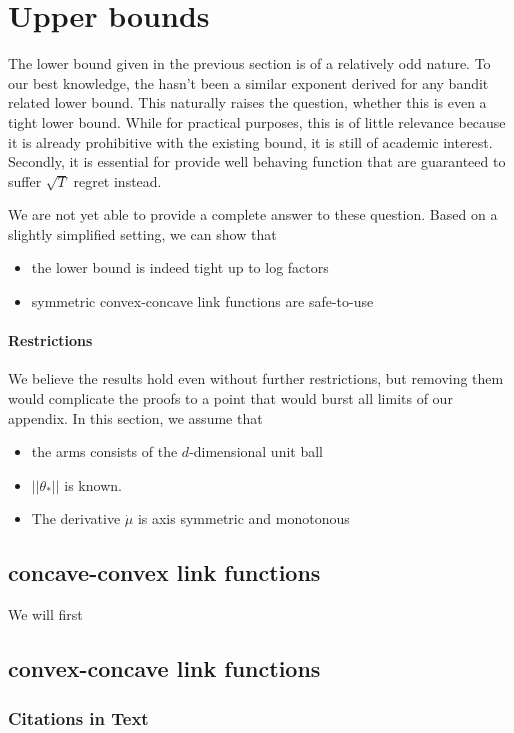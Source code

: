 \documentclass[twoside]{article} \usepackage{aistats2017}
\begin{document}
\section{Upper bounds}\label{upperBounds}
The lower bound given in the previous section is of a relatively odd nature. 
To our best knowledge, the hasn't been a similar exponent derived for any bandit related lower bound.
This naturally raises the question, whether this is even a tight lower bound.
While for practical purposes, this is of little relevance because it is already prohibitive with the existing bound, it is still of academic interest.
Secondly, it is essential for provide well behaving function that are guaranteed to suffer $\sqrt{T}$ regret instead.

We are not yet able to provide a complete answer to these question. 
Based on a slightly simplified setting, we can show that
\begin{itemize}
\item the lower bound is indeed tight up to log factors
\item symmetric convex-concave link functions are safe-to-use
\end{itemize}

\paragraph{Restrictions}
We believe the results hold even without further restrictions, but removing them would complicate the proofs to a point that would burst all limits of our appendix.
In this section, we assume that
\begin{itemize}
\item the arms consists of the $d$-dimensional unit ball
\item $||\theta_*||$ is known.
\item The derivative $\dot{\mu}$ is axis symmetric and monotonous
\end{itemize}
\subsection{concave-convex link functions}
We will first 
\subsection{convex-concave link functions}

\subsubsection{Citations in Text}
\end{document}
